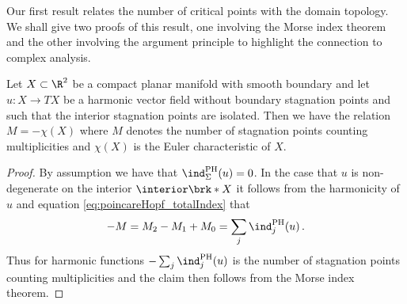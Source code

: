 Our first result relates the number of critical points with the domain topology.
We shall give two proofs of this result, one involving the Morse index theorem and the other involving
the argument principle to highlight the connection to complex analysis.
\begin{proposition}\label{pr:n2_hvf_noInflowNoOutflow}
  Let $X\subset\R^2$ be a compact planar manifold with smooth boundary
  and let $u\colon X\to TX$ be
  a harmonic vector field without boundary stagnation points and such that the interior stagnation points are isolated.
  Then we have the relation $M=-\chi(X)$ where $M$ denotes the number of stagnation points counting multiplicities and
  $\chi(X)$ is the Euler characteristic of $X$.
\end{proposition}
\begin{proof}
  By assumption we have that $\ind^\text{PH}_\Sigma(u)=0$. In the case that $u$ is non-degenerate on the interior $\interior\brk*{X}$
  it follows from the harmonicity of $u$ and equation \eqref{eq:poincareHopf_totalIndex} that
  \begin{align*}
    -M=M_2-M_1+M_0=\sum_j\ind^\text{PH}_j(u)\,.
  \end{align*}
  Thus for harmonic functions $-\sum_j\ind^\text{PH}_j(u)$ is the number of stagnation points counting multiplicities and the
  claim then follows from the Morse index theorem.
\end{proof}
